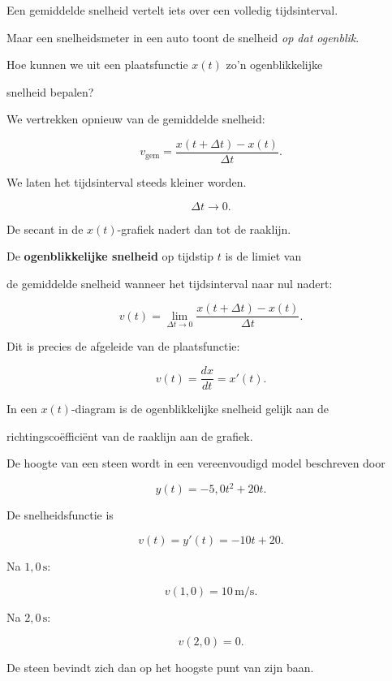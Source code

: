 \documentclass{ximera}
\begin{document}




Een gemiddelde snelheid vertelt iets over een volledig tijdsinterval.

Maar een snelheidsmeter in een auto toont de snelheid \emph{op dat ogenblik}.

Hoe kunnen we uit een plaatsfunctie $x(t)$ zo'n ogenblikkelijke

snelheid bepalen?

We vertrekken opnieuw van de gemiddelde snelheid:

\[v_{\mathrm{gem}} = \frac{x(t+\Delta t)-x(t)}{\Delta t}.\]

We laten het tijdsinterval steeds kleiner worden.

\[\Delta t\longrightarrow 0.\]

De secant in de $x(t)$-grafiek nadert dan tot de raaklijn.

\begin{definitie}

De \textbf{ogenblikkelijke snelheid} op tijdstip $t$ is de limiet van

de gemiddelde snelheid wanneer het tijdsinterval naar nul nadert:

\[\boxed{ v(t) = \lim_{\Delta t\to0} \frac{x(t+\Delta t)-x(t)}{\Delta t}. }\]

Dit is precies de afgeleide van de plaatsfunctie:

\[\boxed{ v(t)=\frac{dx}{dt}=x'(t). }\]

\end{definitie}

\begin{eigenschap}

In een $x(t)$-diagram is de ogenblikkelijke snelheid gelijk aan de

richtingscoëfficiënt van de raaklijn aan de grafiek.

\end{eigenschap}

\begin{voorbeeld}

De hoogte van een steen wordt in een vereenvoudigd model beschreven door

\[y(t)=-5,0t^2+20t.\]

De snelheidsfunctie is

\[v(t)=y'(t)=-10t+20.\]

Na $1,0\,\mathrm{s}$:

\[v(1,0)=10\,\mathrm{m/s}.\]

Na $2,0\,\mathrm{s}$:

\[v(2,0)=0.\]

De steen bevindt zich dan op het hoogste punt van zijn baan.

\end{voorbeeld}
\end{document}
